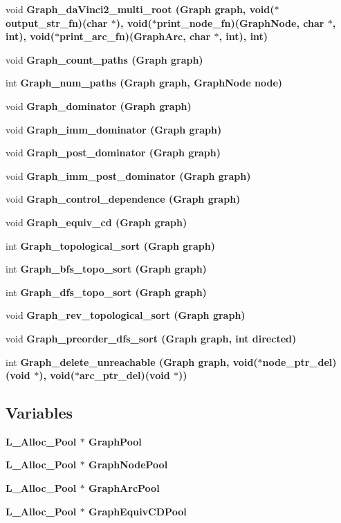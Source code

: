 \begin{CompactItemize}
\item 
void \bf{Graph\_\-da\-Vinci2\_\-multi\_\-root} (\bf{Graph} \bf{graph}, void($\ast$output\_\-str\_\-fn)(char $\ast$), void($\ast$print\_\-node\_\-fn)(\bf{Graph\-Node}, char $\ast$, int), void($\ast$print\_\-arc\_\-fn)(\bf{Graph\-Arc}, char $\ast$, int), int)
\item 
void \bf{Graph\_\-count\_\-paths} (\bf{Graph} \bf{graph})
\item 
int \bf{Graph\_\-num\_\-paths} (\bf{Graph} \bf{graph}, \bf{Graph\-Node} \bf{node})
\item 
void \bf{Graph\_\-dominator} (\bf{Graph} \bf{graph})
\item 
void \bf{Graph\_\-imm\_\-dominator} (\bf{Graph} \bf{graph})
\item 
void \bf{Graph\_\-post\_\-dominator} (\bf{Graph} \bf{graph})
\item 
void \bf{Graph\_\-imm\_\-post\_\-dominator} (\bf{Graph} \bf{graph})
\item 
void \bf{Graph\_\-control\_\-dependence} (\bf{Graph} \bf{graph})
\item 
void \bf{Graph\_\-equiv\_\-cd} (\bf{Graph} \bf{graph})
\item 
int \bf{Graph\_\-topological\_\-sort} (\bf{Graph} \bf{graph})
\item 
int \bf{Graph\_\-bfs\_\-topo\_\-sort} (\bf{Graph} \bf{graph})
\item 
int \bf{Graph\_\-dfs\_\-topo\_\-sort} (\bf{Graph} \bf{graph})
\item 
void \bf{Graph\_\-rev\_\-topological\_\-sort} (\bf{Graph} \bf{graph})
\item 
void \bf{Graph\_\-preorder\_\-dfs\_\-sort} (\bf{Graph} \bf{graph}, int directed)
\item 
int \bf{Graph\_\-delete\_\-unreachable} (\bf{Graph} \bf{graph}, void($\ast$node\_\-ptr\_\-del)(void $\ast$), void($\ast$arc\_\-ptr\_\-del)(void $\ast$))
\end{CompactItemize}
\subsection*{Variables}
\begin{CompactItemize}
\item 
\bf{L\_\-Alloc\_\-Pool} $\ast$ \bf{Graph\-Pool}
\item 
\bf{L\_\-Alloc\_\-Pool} $\ast$ \bf{Graph\-Node\-Pool}
\item 
\bf{L\_\-Alloc\_\-Pool} $\ast$ \bf{Graph\-Arc\-Pool}
\item 
\bf{L\_\-Alloc\_\-Pool} $\ast$ \bf{Graph\-Equiv\-CDPool}
\end{CompactItemize}


